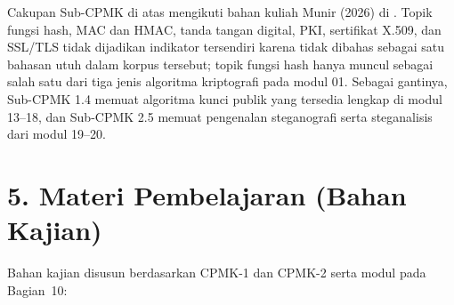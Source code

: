 \documentclass[12pt,a4paper]{article}
\begin{document}
\noindent Cakupan Sub-CPMK di atas mengikuti bahan kuliah Munir (2026) di . Topik fungsi hash, MAC dan HMAC, tanda tangan digital, PKI, sertifikat X.509, dan SSL/TLS tidak dijadikan indikator tersendiri karena tidak dibahas sebagai satu bahasan utuh dalam korpus tersebut; topik fungsi hash hanya muncul sebagai salah satu dari tiga jenis algoritma kriptografi pada modul 01. Sebagai gantinya, Sub-CPMK 1.4 memuat algoritma kunci publik yang tersedia lengkap di modul 13--18, dan Sub-CPMK 2.5 memuat pengenalan steganografi serta steganalisis dari modul 19--20.

\vspace{0.5cm}

\section*{5. Materi Pembelajaran (Bahan Kajian)}

Bahan kajian disusun berdasarkan CPMK-1 dan CPMK-2 serta modul pada Bagian~10:
\end{document}
